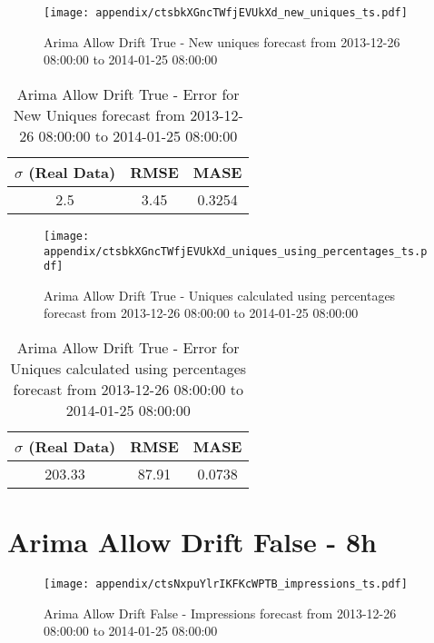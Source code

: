 \begin{figure}[H] \begin{center} \leavevmode
\texttt{[image: appendix/ctsbkXGncTWfjEVUkXd\_new\_uniques\_ts.pdf]} \caption[]{
Arima Allow Drift True - New uniques forecast from 2013-12-26 08:00:00 to 2014-01-25 08:00:00} \label{fig:appendix/ctsbkXGncTWfjEVUkXd_new_uniques_ts.pdf} \end{center}
\end{figure}

\begin{table}[H]
\centering
\footnotesize
\begin{tabular}{ccc}
$\sigma$ (Real Data) & RMSE & MASE   \\ \hline
2.5 & 3.45 & 0.3254 \\
\end{tabular}

\vspace{0.5cm}

\caption[]{
Arima Allow Drift True - Error for New Uniques forecast from 2013-12-26 08:00:00 to 2014-01-25 08:00:00}
\end{table}

\begin{figure}[H] \begin{center} \leavevmode
\texttt{[image: appendix/ctsbkXGncTWfjEVUkXd\_uniques\_using\_percentages\_ts.pdf]} \caption[]{
Arima Allow Drift True - Uniques calculated using percentages forecast from 2013-12-26 08:00:00 to 2014-01-25 08:00:00} \label{fig:appendix/ctsbkXGncTWfjEVUkXd_uniques_using_percentages_ts.pdf} \end{center}
\end{figure}

\begin{table}[H]
\centering
\footnotesize
\begin{tabular}{ccc}
$\sigma$ (Real Data) & RMSE & MASE   \\ \hline
203.33 & 87.91 & 0.0738 \\
\end{tabular}

\vspace{0.5cm}

\caption[]{
Arima Allow Drift True - Error for Uniques calculated using percentages forecast from 2013-12-26 08:00:00 to 2014-01-25 08:00:00}
\end{table}

\section{Arima Allow Drift False - 8h}
\begin{figure}[H] \begin{center} \leavevmode
\texttt{[image: appendix/ctsNxpuYlrIKFKcWPTB\_impressions\_ts.pdf]} \caption[]{
Arima Allow Drift False - Impressions forecast from 2013-12-26 08:00:00 to 2014-01-25 08:00:00} \label{fig:appendix/ctsNxpuYlrIKFKcWPTB_impressions_ts.pdf} \end{center}
\end{figure}

